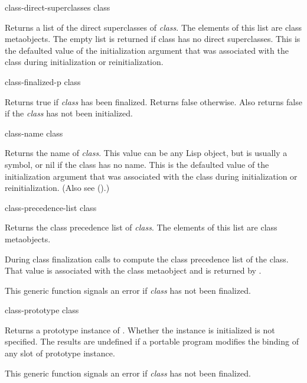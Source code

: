 \begin{defun}
class-direct-superclasses class

Returns a list of the direct superclasses of \emph{class}. The elements of this
list are class metaobjects. The empty list is returned if class has no direct
superclasses. This is the defaulted value of the 
initialization argument that was associated with the class during initialization
or reinitialization.
\end{defun}

\begin{defun}
class-finalized-p class

Returns true if \emph{class} has been finalized. Returns false otherwise. Also
returns false if the \emph{class} has not been initialized.
\end{defun}

\begin{defun}
class-name class

Returns the name of \emph{class}. This value can be any Lisp object, but is usually a
symbol, or nil if the class has no name. This is the defaulted value of the
 initialization argument that was associated with the class during
initialization or reinitialization. (Also see ().)
\end{defun}

\begin{defun}
class-precedence-list class

Returns the class precedence list of \emph{class}. The elements of this list are
class metaobjects.

During class finalization  calls
 to compute the class precedence list of the
class. That value is associated with the class metaobject and is returned by
.

This generic function signals an error if \emph{class} has not been finalized.
\end{defun}

\begin{defun}
class-prototype class

Returns a prototype instance of . Whether the instance is initialized is
not specified. The results are undefined if a portable program modifies the
binding of any slot of prototype instance.

This generic function signals an error if \emph{class} has not been finalized.
\end{defun}

